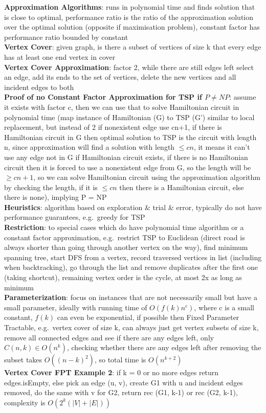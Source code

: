 \documentclass[a4paper]{article}
\begin{document}
\begin{multicols}{2}
        \textbf{Approximation Algorithms}: runs in polynomial time and finds solution that is close to optimal, performance ratio is the ratio of the approximation solution over the optimal solution (opposite if maximisation problem), constant factor has performance ratio bounded by constant\\
        \textbf{Vertex Cover}: given graph, is there a subset of vertices of size k that every edge has at least one end vertex in cover\\
        \textbf{Vertex Cover Approximation}: factor 2, while there are still edges left select an edge, add its ends to the set of vertices, delete the new vertices and all incident edges to both\\
        \textbf{Proof of no Constant Factor Approximation for TSP if $P \neq NP$}: assume it exists with factor c, then we can use that to solve Hamiltonian circuit in polynomial time (map instance of Hamiltonian (G) to TSP (G') similar to local replacement, but instead of 2 if nonexistent edge use cn+1, if there is Hamiltonian circuit in G then optimal solution to TSP is the circuit with length n, since approximation will find a solution with length $\leq cn$, it means it can't use any edge not in G if Hamiltonian circuit exists, if there is no Hamiltonian circuit then it is forced to use a nonexistent edge from G, so the length will be $\geq cn+1$, so we can solve Hamiltonian circuit using the approximation algorithm by checking the length, if it is $\leq cn$ then there is a Hamiltonian circuit, else there is none), implying P = NP\\
        \textbf{Heuristics}: algorithm based on exploration \& trial \& error, typically do not have performance guarantees, e.g.\ greedy for TSP\\
        \textbf{Restriction}: to special cases which do have polynomial time algorithm or a constant factor approximation, e.g.\ restrict TSP to Euclidean (direct road is always shorter than going through another vertex on the way), find minimum spanning tree, start DFS from a vertex, record traversed vertices in list (including when backtracking), go through the list and remove duplicates after the first one (taking shortcut), remaining vertex order is the cycle, at most 2x as long as minimum\\
        \textbf{Parameterization}: focus on instances that are not necessarily small but have a small parameter, ideally with running time of $O(f(k)n^c)$, where c is a small constant, $f(k)$ can even be exponential, if possible then Fixed Parameter Tractable, e.g.\ vertex cover of size k, can always just get vertex subsets of size k, remove all connected edges and see if there are any edges left, only $C(n, k) \in O(n^k)$, checking whether there are any edges left after removing the subset takes $O({(n-k)}^2)$, so total time is $O(n^{k+2})$\\
        \textbf{Vertex Cover FPT Example 2}: if k = 0 or no more edges return edges.isEmpty, else pick an edge (u, v), create G1 with u and incident edges removed, do the same with v for G2, return rec (G1, k-1) or rec (G2, k-1), complexity is $O(2^k (|V|+|E|))$\\
    \end{multicols}
    
\end{document}
